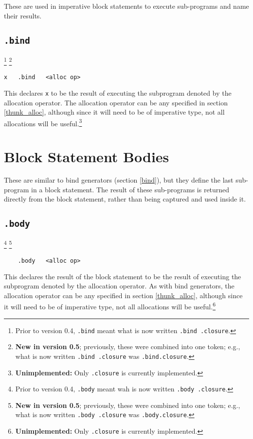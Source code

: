 \documentclass{report}
\newcommand\stringcode[1]{\texttt{#1}}
\newcommand\unimpl[1]{\footnote{\textbf{Unimplemented: }#1}}
\newcommand\old[2]{\footnote{Prior to version #1, #2}}
\newcommand\new[2]{\footnote{\textbf{New in version #1}; previously, #2}}
\begin{document}
These are used in imperative block statements to execute sub-programs and name their results.

\subsection{\stringcode{.bind}}
\old{0.4}{\stringcode{.bind} meant what is now written \stringcode{.bind	.closure}.}
\new{0.5}{these were combined into one token; e.g., what is now written \stringcode{.bind	.closure} was \stringcode{.bind.closure}.}

\begin{verbatim}
x	.bind	<alloc op>
\end{verbatim}

This declares \stringcode{x} to be the result of executing the subprogram denoted by the allocation operator.
The allocation operator can be any specified in section \ref{thunk_alloc},
although since it will need to be of imperative type, not all allocations will be useful.\unimpl{Only \stringcode{.closure} is currently implemented.}

\section{Block Statement Bodies}
\label{body}

These are similar to bind generators (section \ref{bind}), but they define the last sub-program in a block statement.
The result of these sub-programs is returned directly from the block statement, rather than being captured and used inside it.

\subsection{\stringcode{.body}}
\old{0.4}{\stringcode{.body} meant wah is now written \stringcode{.body	.closure}.}
\new{0.5}{these were combined into one token; e.g., what is now written \stringcode{.body	.closure} was \stringcode{.body.closure}.}

\begin{verbatim}
	.body	<alloc op>
\end{verbatim}

This declares the result of the block statement to be the result of executing the subprogram denoted by the allocation operator.
As with bind generators, the allocation operator can be any specified in section \ref{thunk_alloc},
although since it will need to be of imperative type, not all allocations will be useful.\unimpl{Only \stringcode{.closure} is currently implemented.}
\end{document}
